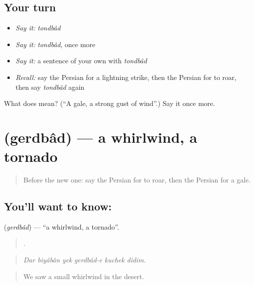 \subsection*{Your turn}
\begin{itemize}
\raggedright
  \item \emph{Say it:} \emph{tondbâd}
  \item \emph{Say it:} \emph{tondbâd}, once more
  \item \emph{Say it:} a sentence of your own with \emph{tondbâd}
  \item \emph{Recall:} say the Persian for a lightning strike, then the Persian for to roar, then say \emph{tondbâd} again
\end{itemize}

\begin{tcolorbox}[breakable,colback=teal!4,colframe=teal!35!black,title={Before you move on}]
What does  mean? (\textquotedblleft{}A gale, a strong gust of wind\textquotedblright{}.) Say it once more.
\end{tcolorbox}
\section[\texorpdfstring{\fa{گردباد} (gerdbâd)}{گردباد (gerdbâd)}]{ (gerdbâd) — a whirlwind, a tornado}

\label{lesson:FA-C475-gerdbad}



\begin{quote}
Before the new one: say the Persian for to roar, then the Persian for a gale.
\end{quote}

\subsection*{You'll want to know: }
\textbf{} (\emph{gerdbâd}) — \textquotedblleft{}a whirlwind, a tornado\textquotedblright{}.

\begin{quote}
     .
\end{quote}

\begin{quote}
\emph{Dar biyâbân yek gerdbâd-e kuchek didim.}
\end{quote}

\begin{quote}
We saw a small whirlwind in the desert.
\end{quote}

